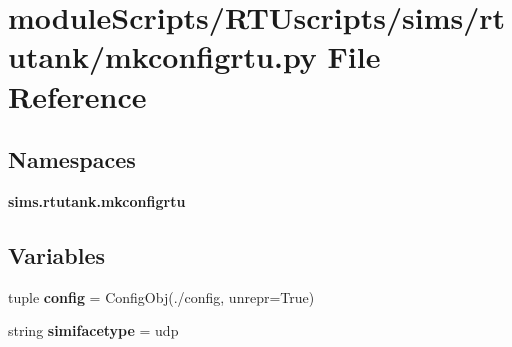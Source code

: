 \section{module\+Scripts/\+R\+T\+Uscripts/sims/rtutank/mkconfigrtu.py File Reference}
\label{mkconfigrtu_8py}
\subsection*{Namespaces}
\begin{DoxyCompactItemize}
\item 
 {\bf sims.\+rtutank.\+mkconfigrtu}
\end{DoxyCompactItemize}
\subsection*{Variables}
\begin{DoxyCompactItemize}
\item 
tuple {\bf config} = Config\+Obj(\textquotesingle{}./config\textquotesingle{}, unrepr=True)
\item 
string {\bf simifacetype} = \textquotesingle{}udp\textquotesingle{}
\end{DoxyCompactItemize}
